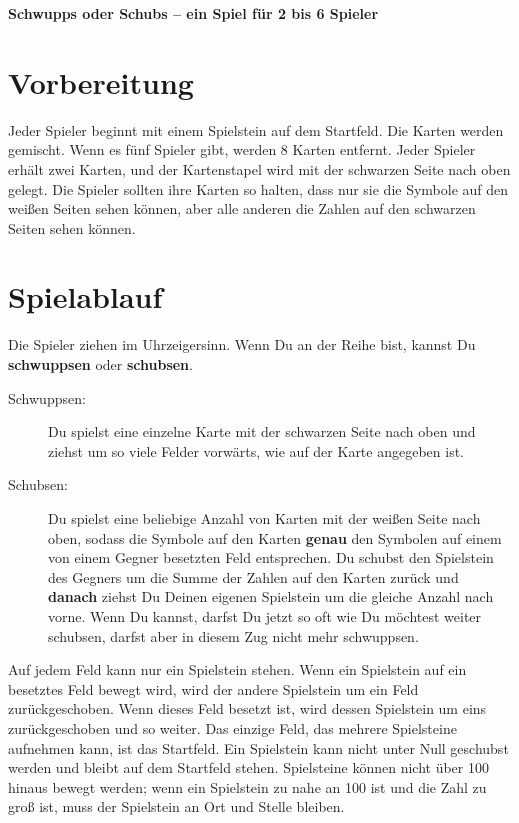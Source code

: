 \documentclass{article}
\begin{document}
{\center\LARGE\textbf{Schwupps oder Schubs -- ein Spiel für 2 bis 6 Spieler}}

\section*{Vorbereitung}

Jeder Spieler beginnt mit einem Spielstein auf dem Startfeld. Die Karten werden gemischt. Wenn es fünf Spieler gibt, werden 8 Karten entfernt. Jeder Spieler erhält zwei Karten, und der Kartenstapel wird mit der schwarzen Seite nach oben gelegt. Die Spieler sollten ihre Karten so halten, dass nur sie die Symbole auf den weißen Seiten sehen können, aber alle anderen die Zahlen auf den schwarzen Seiten sehen können.

\section*{Spielablauf}

Die Spieler ziehen im Uhrzeigersinn. Wenn Du an der Reihe bist, kannst Du \textbf{schwuppsen} oder \textbf{schubsen}.

\begin{description}

\item[Schwuppsen:] 

Du spielst eine einzelne Karte mit der schwarzen Seite nach oben und ziehst um so viele Felder vorwärts, wie auf der Karte angegeben ist.

\item[Schubsen:]

Du spielst eine beliebige Anzahl von Karten mit der weißen Seite nach oben, sodass die Symbole auf den Karten \textbf{genau} den Symbolen auf einem von einem Gegner besetzten Feld entsprechen. Du schubst den Spielstein des Gegners um die Summe der Zahlen auf den Karten zurück und \textbf{danach} ziehst Du Deinen eigenen Spielstein um die gleiche Anzahl nach vorne. Wenn Du kannst, darfst Du jetzt so oft wie Du möchtest weiter schubsen, darfst aber in diesem Zug nicht mehr schwuppsen.

\end{description}

Auf jedem Feld kann nur ein Spielstein stehen. Wenn ein Spielstein auf ein besetztes Feld bewegt wird, wird der andere Spielstein um ein Feld zurückgeschoben. Wenn dieses Feld besetzt ist, wird dessen Spielstein um eins zurückgeschoben und so weiter. Das einzige Feld, das mehrere Spielsteine aufnehmen kann, ist das Startfeld. Ein Spielstein kann nicht unter Null geschubst werden und bleibt auf dem Startfeld stehen. Spielsteine können nicht über 100 hinaus bewegt werden; wenn ein Spielstein zu nahe an 100 ist und die Zahl zu groß ist, muss der Spielstein an Ort und Stelle bleiben.
\end{document}

